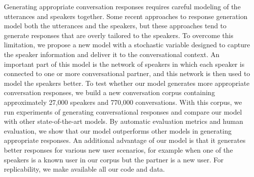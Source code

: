 Generating appropriate conversation responses requires careful modeling of the utterances and speakers together.
Some recent approaches to response generation model both the utterances and the speakers, but these approaches tend to generate responses that are overly tailored to the speakers.
To overcome this limitation, we propose a new model with a stochastic variable designed to capture the speaker information and deliver it to the conversational context.
An important part of this model is the network of speakers in which each speaker is connected to one or more conversational partner, and this network is then used to model the speakers better.
To test whether our model generates more appropriate conversation responses, we build a new conversation corpus containing approximately 27,000 speakers and 770,000 conversations. 
With this corpus, we run experiments of generating conversational responses and compare our model with other state-of-the-art models. By automatic evaluation metrics and human evaluation, we show that our model outperforms other models in generating appropriate responses.
An additional advantage of our model is that it generates better responses for various new user scenarios, for example when one of the speakers is a known user in our corpus but the partner is a new user. 
For replicability, we make available all our code and data.